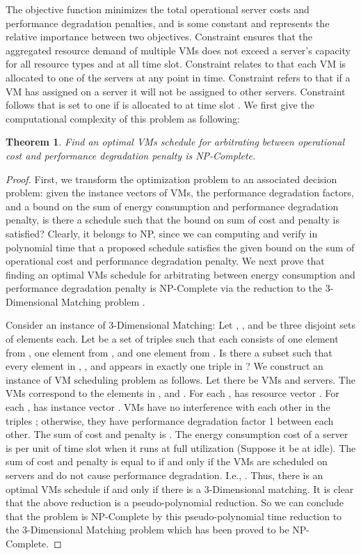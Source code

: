 \documentclass[10pt,journal]{IEEEtran}
\begin{document}
The objective function  minimizes the total operational server costs and performance degradation penalties, and  is some constant and represents the relative importance between two objectives. Constraint  ensures that the aggregated resource demand of multiple VMs does not exceed a server's capacity for all resource types and at all time slot. Constraint  relates to that each VM is allocated to one of the servers at any point in time. Constraint  refers to that if a VM has assigned on a server it will not be assigned to other servers. Constraint  follows that  is set to one if  is allocated to  at time slot . We first give the computational complexity of this problem as following:
\newtheorem{theorem}{Theorem}
\begin{theorem}
Find an optimal VMs schedule for arbitrating between operational cost and performance degradation penalty is NP-Complete. \label{theorem:hardness}
\end{theorem}
\begin{proof}
First, we transform the optimization problem to an associated decision problem: given the instance vectors of VMs, the performance degradation factors, and a bound on the sum of energy consumption and performance degradation penalty, is there a schedule such that the bound on sum of cost and penalty is satisfied? Clearly, it belongs to NP, since we can computing and verify in polynomial time that a proposed schedule satisfies the given bound on the sum of operational cost and performance degradation penalty. We next prove that finding an optimal VMs schedule for arbitrating between energy consumption and performance degradation penalty is NP-Complete via the reduction to the 3-Dimensional Matching problem \cite{Garey79, Leung04}.

Consider an instance of 3-Dimensional Matching: Let , , and  be three disjoint sets of  elements each. Let  be a set of triples such that each  consists of one element from , one element from , and one element from . Is there a subset  such that every element in , , and  appears in exactly one triple in ? We construct an instance of VM scheduling problem as follows. Let there be  VMs and  servers. The VMs correspond to the elements in ,  and . For each ,  has resource vector  . For each ,  has instance vector . VMs have no interference with each other in the triples ; otherwise, they have performance degradation factor 1 between each other. The sum of cost and penalty is . The energy consumption cost of a server is  per unit of time slot when it runs at full utilization (Suppose it be  at idle). The sum of cost and penalty is equal to  if and only if the  VMs are scheduled on  servers and do not cause performance degradation. I.e., . Thus, there is an optimal VMs schedule if and only if there is a 3-Dimensional matching. It is clear that the above reduction is a pseudo-polynomial reduction. So we can conclude that the problem is NP-Complete by this pseudo-polynomial time reduction to the 3-Dimensional Matching problem which has been proved to be NP-Complete.
\end{proof}
\end{document}
